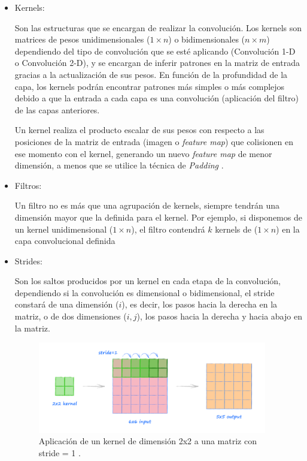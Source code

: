                 \begin{itemize}

                    \item Kernels:

                        Son las estructuras que se encargan de realizar la convolución. Los kernels son matrices de pesos unidimensionales ($1 \times n$) o bidimensionales ($n \times m$) dependiendo del tipo de convolución que se esté aplicando (Convolución 1-D o Convolución 2-D), y se encargan de inferir patrones en la matriz de entrada gracias a la actualización de sus pesos. En función de la profundidad de la capa, los kernels podrán encontrar patrones más simples o más complejos debido a que la entrada a cada capa es una convolución (aplicación del filtro) de las capas anteriores.

                        Un kernel realiza el producto escalar de sus pesos con respecto a las posiciones de la matriz de entrada (imagen o \textit{feature map}) que colisionen en ese momento con el kernel, generando un nuevo \textit{feature map} de menor dimensión, a menos que se utilice la técnica de \textit{Padding} \cite{Kernels}.
                         
                    \item Filtros:

                        Un filtro no es más que una agrupación de kernels, siempre tendrán una dimensión mayor que la definida para el kernel. Por ejemplo, si disponemos de un kernel unidimensional ($1 \times n$), el filtro contendrá $k$ kernels de ($1 \times n$) en la capa convolucional definida \cite{FiltersFeatureMaps}

                    \item Strides:

                        Son los saltos producidos por un kernel en cada etapa de la convolución, dependiendo si la convolución es dimensional o bidimensional, el stride constará de una dimensión ($i$), es decir, los pasos hacia la derecha en la matriz, o de dos dimensiones ($i, j$), los pasos hacia la derecha y hacia abajo en la matriz.

                        \begin{figure}[h]
                            \centering
                            \captionsetup{width=.65\textwidth}
                            \includegraphics[width=10cm]{archivos/3.Tecnologias/RedesNeuronales/Stride}
                            \caption{Aplicación de un kernel de dimensión 2x2 a una matriz con stride = 1 \cite{ReferenciaImagenStrides}.}
                            \label{StrideImage}
                         \end{figure}


\end{itemize}
